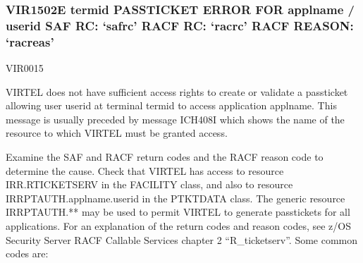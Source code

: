 \documentclass[letterpaper,10pt,english]{sphinxmanual}
\begin{document}
\subsubsection{VIR1502E termid PASSTICKET ERROR FOR applname / userid SAF RC: ‘safrc’ RACF RC: ‘racrc’ RACF REASON: ‘racreas’}
\label{\detokenize{messages:vir1502e-termid-passticket-error-for-applname-userid-saf-rc-safrc-racf-rc-racrc-racf-reason-racreas}}\begin{description}
\sphinxAtStartPar
VIR0015

\sphinxAtStartPar
VIRTEL does not have sufficient access rights to create or validate a passticket allowing user userid at terminal termid to access application applname. This message is usually preceded by message ICH408I which shows the name of the resource to which VIRTEL must be granted access.

\sphinxAtStartPar
Examine the SAF and RACF return codes and the RACF reason code to determine the cause. Check that VIRTEL has access to resource IRR.RTICKETSERV in the FACILITY class, and also to resource IRRPTAUTH.applname.userid in the PTKTDATA class. The generic resource IRRPTAUTH.** may be used to permit VIRTEL to generate passtickets for all applications.
For an explanation of the return codes and reason codes, see z/OS Security Server RACF Callable Services chapter 2 “R\_ticketserv”. Some common codes are:

\end{description}

\begin{sphinxVerbatim}[commandchars=\\\{\}]
           
                            
                                    
                                       
\end{sphinxVerbatim}
\end{document}
